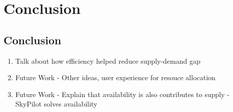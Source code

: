\chapter{Conclusion}
\label{ch_conclusion}



\section{Conclusion}

\begin{enumerate}
    \item Talk about how efficiency helped reduce supply-demand gap
    \item Future Work - Other ideas, user experience for resouce allocation
    \item Future Work - Explain that availability is also contributes to supply - SkyPilot solves availability
\end{enumerate}